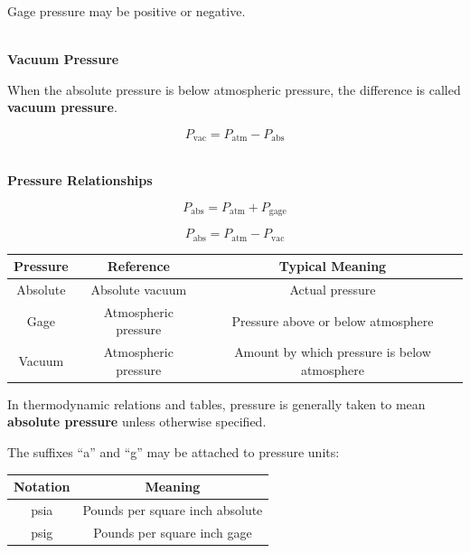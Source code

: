 \documentclass[12pt]{article}
\begin{document}
Gage pressure may be positive or negative.

\textbf{\\ Vacuum Pressure}

When the absolute pressure is below atmospheric pressure, the difference is called \textbf{vacuum pressure}.

\begin{equation*}
    P_{\mathrm{vac}} = P_{\mathrm{atm}} - P_{\mathrm{abs}}
\end{equation*}

\textbf{\\ Pressure Relationships}

\begin{equation*}
    P_{\mathrm{abs}} = P_{\mathrm{atm}} + P_{\mathrm{gage}}
\end{equation*}

\begin{equation*}
    P_{\mathrm{abs}} = P_{\mathrm{atm}} - P_{\mathrm{vac}}
\end{equation*}

\begin{center}
    \begin{tabular}{|c|c|c|}
        \hline
        \textbf{Pressure} & \textbf{Reference} & \textbf{Typical Meaning} \\
        \hline
        Absolute & Absolute vacuum & Actual pressure \\
        \hline
        Gage & Atmospheric pressure & Pressure above or below atmosphere \\
        \hline
        Vacuum & Atmospheric pressure & Amount by which pressure is below atmosphere \\
        \hline
    \end{tabular}
\end{center}

In thermodynamic relations and tables, pressure is generally taken to mean \textbf{absolute pressure} unless otherwise specified.

The suffixes ``a'' and ``g'' may be attached to pressure units:

\begin{center}
    \begin{tabular}{|c|c|}
        \hline
        \textbf{Notation} & \textbf{Meaning} \\
        \hline
        psia & Pounds per square inch absolute \\
        \hline
        psig & Pounds per square inch gage \\
        \hline
    \end{tabular}
\end{center}
\end{document}
